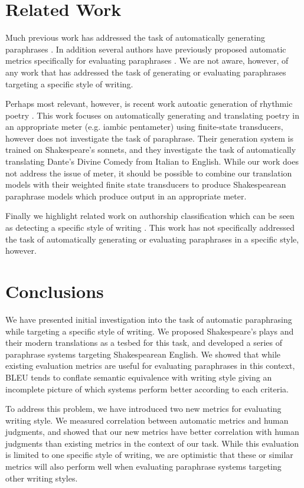 \documentclass[10pt,a5paper,twoside]{article}
\begin{document}
\section{Related Work}
Much previous work has addressed the task of automatically generating paraphrases \cite{Barzilay03,dolan04,Shinyama03,Das09,bannard05,Callison-Burch08,Kok10}.  
In addition several authors have previously proposed 
automatic metrics specifically for evaluating paraphrases \cite{chen11,Callison-Burch08b,liu10}.
We are not aware, however, of any work that has addressed the task of generating or evaluating
paraphrases targeting a specific style of writing.

Perhaps most relevant, however, is recent work autoatic generation of rhythmic poetry \cite{Greene10}.  This work focuses on automatically generating and translating
poetry in an appropriate meter (e.g. iambic pentameter) using finite-state transducers, however does not investigate the task of paraphrase.  Their generation system
is trained on Shakespeare's sonnets, and they investigate the task of automatically translating Dante's Divine Comedy from Italian to English.
While our work does not address the issue of meter, it should be possible to combine our translation
models with their weighted finite state transducers to produce Shakespearean paraphrase models which produce output in an appropriate meter.

Finally we highlight related work on authorship classification which can be seen as detecting a specific style of writing \cite{Gamon04,Raghavan10}.
This work has not specifically addressed the task of automatically generating or evaluating paraphrases in a specific style, however.

\section{Conclusions}
We have presented initial investigation into the task of automatic paraphrasing while targeting a specific style of writing.  We proposed Shakespeare's plays and their
modern translations as a tesbed for this task, and developed a series of paraphrase systems targeting Shakespearean English.  We showed that while existing evaluation
metrics are useful for evaluating paraphrases in this context, BLEU tends to conflate semantic equivalence with writing style giving an incomplete picture of which systems
perform better according to each criteria.  

To address this problem, we have introduced two new metrics for evaluating writing style.
We measured correlation between automatic metrics and human judgments, and showed
that our new metrics have better correlation with human judgments than existing metrics in the context of our task.
While this evaluation is limited to one specific style of writing, we are optimistic that these or similar metrics will also perform well when
evaluating paraphrase systems targeting other writing styles.
\end{document}
